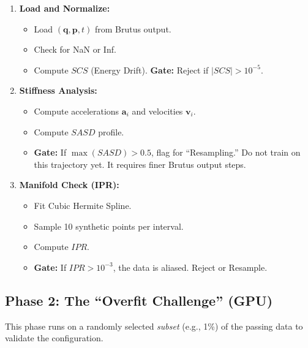 \documentclass[11pt, a4paper]{article}
\newcommand{\vect}[1]{\mathbf{#1}} %
\begin{document}
\begin{enumerate}
    \item \textbf{Load and Normalize:}
    \begin{itemize}
        \item Load $(\vect{q}, \vect{p}, t)$ from Brutus output.
        \item Check for NaN or Inf.
        \item Compute $SCS$ (Energy Drift). \textbf{Gate:} Reject if $|SCS| > 10^{-5}$.
    \end{itemize}
    \item \textbf{Stiffness Analysis:}
    \begin{itemize}
        \item Compute accelerations $\vect{a}_i$ and velocities $\vect{v}_i$.
        \item Compute $SASD$ profile.
        \item \textbf{Gate:} If $\max(SASD) > 0.5$, flag for ``Resampling.'' Do not train on this trajectory yet. It requires finer Brutus output steps.
    \end{itemize}
    \item \textbf{Manifold Check (IPR):}
    \begin{itemize}
        \item Fit Cubic Hermite Spline.
        \item Sample 10 synthetic points per interval.
        \item Compute $IPR$.
        \item \textbf{Gate:} If $IPR > 10^{-3}$, the data is aliased. Reject or Resample.
    \end{itemize}
\end{enumerate}

\subsection{Phase 2: The ``Overfit Challenge'' (GPU)}
This phase runs on a randomly selected \textit{subset} (e.g., 1\%) of the passing data to validate the configuration.
\end{document}
